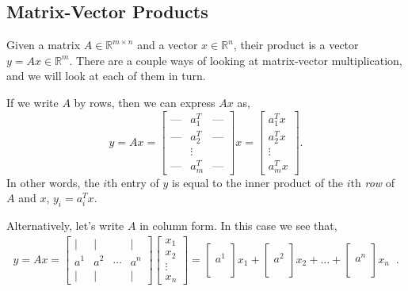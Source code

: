 \documentclass[12pt]{article}
\begin{document}
\subsection{Matrix-Vector Products}

Given a matrix $A \in \mathbb{R}^{m \times n}$ and a vector $x \in
\mathbb{R}^n$, their product is a vector $y = Ax \in \mathbb{R}^m$.
There are a couple ways of looking at matrix-vector multiplication,
and we will look at each of them in turn.

If we write $A$ by rows, then we can express $Ax$ as,
\[ y = Ax = \left [ \begin{array}{ccc} \mbox{---} & a^T_1 & 
  \mbox{---} \\   \mbox{---} & a^T_2 &  \mbox{---} \\ & \vdots & \\
  \mbox{---} & a^T_m  &  \mbox{---} \end{array} \right ] x = \left [
  \begin{array}{c} a^T_1 x \\ a^T_2 x \\ \vdots \\ a^T_m x 
  \end{array} \right ]. \]
In other words, the $i$th entry of $y$ is equal to the inner
product of the $i$th \textit{row} of $A$ and $x$, $y_i = a_i^T x$.

Alternatively, let's write $A$ in column form.  In this case we see
that,
\begin{align}
y = Ax = \left [ \begin{array}{cccc} | & | &  & 
| \\ a^1 & a^2 & \cdots & a^n \\ | & | &  & |
\end{array} \right ] \left [ \begin{array}{c} x_1 \\ x_2 \\ \vdots
\\ x_n \end{array} \right  ] = \left [ \begin{array}{c}  \\ a^1
\\  \\ \end{array} \right ] x_1 + \left [ \begin{array}{c}  \\ a^2
\\  \\ \end{array} \right ] x_2 + \ldots +  \left [ \begin{array}{c}
\\ a^n \\  \\ \end{array} \right ] x_n \;\;.  \label{eqn:2}
\end{align}
\end{document}
